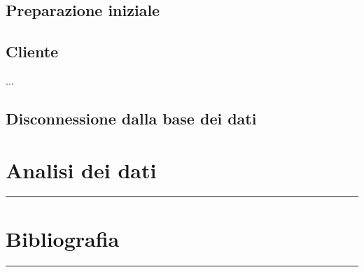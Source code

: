 \documentclass[legalpaper]{article}
\begin{document}
\subsection{Preparazione iniziale}
\subsection{Cliente}

...

\subsection{Disconnessione dalla base dei dati}
\newpage
\section{Analisi dei dati}
\rule{\linewidth}{1.5pt}

\newpage

\section{Bibliografia}
\rule{\linewidth}{1.5pt}
\end{document}

